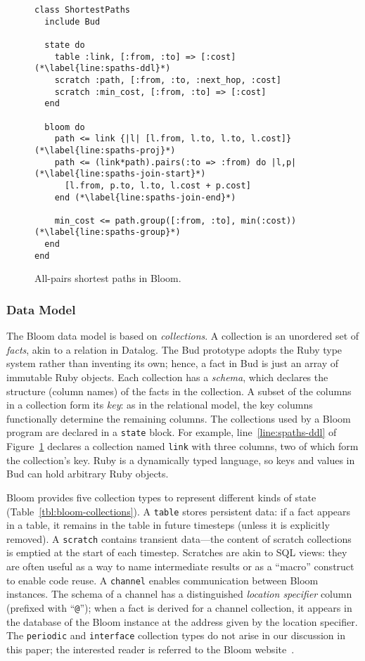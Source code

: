 \begin{figure}[t]
\begin{scriptsize}
\begin{lstlisting}
class ShortestPaths
  include Bud

  state do
    table :link, [:from, :to] => [:cost] (*\label{line:spaths-ddl}*)
    scratch :path, [:from, :to, :next_hop, :cost]
    scratch :min_cost, [:from, :to] => [:cost]
  end

  bloom do
    path <= link {|l| [l.from, l.to, l.to, l.cost]} (*\label{line:spaths-proj}*)
    path <= (link*path).pairs(:to => :from) do |l,p| (*\label{line:spaths-join-start}*)
      [l.from, p.to, l.to, l.cost + p.cost]
    end (*\label{line:spaths-join-end}*)

    min_cost <= path.group([:from, :to], min(:cost)) (*\label{line:spaths-group}*)
  end
end
\end{lstlisting}
\end{scriptsize}
\caption{All-pairs shortest paths in Bloom.}
\label{fig:bloom-spaths}
\end{figure}

\subsubsection{Data Model}
The Bloom data model is based on \emph{collections}.  A collection is an
unordered set of \emph{facts}, akin to a relation in Datalog. The Bud prototype
adopts the Ruby type system rather than inventing its own; hence, a fact in Bud
is just an array of immutable Ruby objects. Each collection has a \emph{schema},
which declares the structure (column names) of the facts in the collection. A
subset of the columns in a collection form its \emph{key}: as in the relational
model, the key columns functionally determine the remaining columns. The
collections used by a Bloom program are declared in a \texttt{state} block. For
example, line~\ref{line:spaths-ddl} of Figure~\ref{fig:bloom-spaths} declares a
collection named \texttt{link} with three columns, two of which form the
collection's key. Ruby is a dynamically typed language, so keys and values in
Bud can hold arbitrary Ruby objects.

Bloom provides five collection types to represent different kinds of state
(Table~\ref{tbl:bloom-collections}). A \texttt{table} stores persistent data: if
a fact appears in a table, it remains in the table in future timesteps (unless
it is explicitly removed). A \texttt{scratch} contains transient data---the
content of scratch collections is emptied at the start of each
timestep. Scratches are akin to SQL views: they are often useful as a way to
name intermediate results or as a ``macro'' construct to enable code reuse. A
\texttt{channel} enables communication between Bloom instances. The schema of a
channel has a distinguished \emph{location specifier} column (prefixed with
``\texttt{@}''); when a fact is derived for a channel collection, it appears in
the database of the Bloom instance at the address given by the location
specifier. The \texttt{periodic} and \texttt{interface} collection types do not
arise in our discussion in this paper; the interested reader is referred to the
Bloom website~\cite{bloom}.

